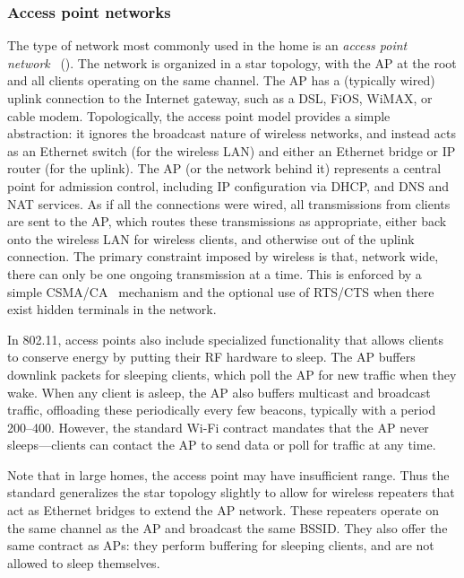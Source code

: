 \subsubsection{Access point networks} The type of network most commonly used in the home is an \emph{access point network}~\cite{80211,nagus_homerf} (). The network is organized in a star topology, with the AP at the root and all clients operating on the same channel. The AP has a (typically wired) uplink connection to the Internet gateway, such as a DSL, FiOS, WiMAX, or cable modem. Topologically, the access point model provides a simple abstraction: it ignores the broadcast nature of wireless networks, and instead acts as an Ethernet switch (for the wireless LAN) and either an Ethernet bridge or IP router (for the uplink). The AP (or the network behind it) represents a central point for admission control, including IP configuration via DHCP, and DNS and NAT services. As if all the connections were wired, all transmissions from clients are sent to the AP, which routes these transmissions as appropriate, either back onto the wireless LAN for wireless clients, and otherwise out of the uplink connection. The primary constraint imposed by wireless is that, network wide, there can only be one ongoing transmission at a time. This is enforced by a simple CSMA/CA~\cite{karn_maca} mechanism and the optional use of RTS/CTS when there exist hidden terminals in the network.

In 802.11, access points also include specialized functionality that allows clients to conserve energy by putting their RF hardware to sleep. The AP buffers downlink packets for sleeping clients, which poll the AP for new traffic when they wake. When any client is asleep, the AP also buffers multicast and broadcast traffic, offloading these periodically every few beacons, typically with a period 200\ms--400\ms. However, the standard Wi-Fi contract mandates that the AP never sleeps---clients can contact the AP to send data or poll for traffic at any time.

Note that in large homes, the access point may have insufficient range. Thus the standard generalizes the star topology slightly to allow for wireless repeaters that act as Ethernet bridges to extend the AP network. These repeaters operate on the same channel as the AP and broadcast the same BSSID\@. They also offer the same contract as APs: they perform buffering for sleeping clients, and are not allowed to sleep themselves.

